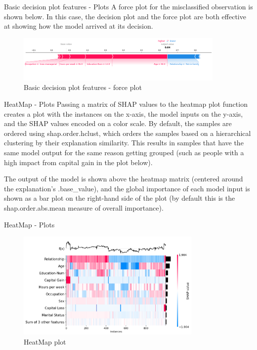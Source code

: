 \documentclass[aspectratio=169]{beamer}
\begin{document}
\begin{frame}{Basic decision plot features - Plots}
A force plot for the misclassified observation is shown below. In this case, the decision plot and the force plot are both effective at showing how the model arrived at its decision.
    \begin{figure}[htbp]
        \centering
        \includegraphics[width=0.9\textwidth]{figs/shap/plots/decision/example_notebooks_api_examples_plots_decision_plot_16_0.png}
        \caption{Basic decision plot features - force plot}
        \label{fig:force-inspection-misclassified-decision}
    \end{figure}
\end{frame}

\begin{frame}{HeatMap - Plots}
Passing a matrix of \ac{SHAP} values to the heatmap plot function creates a plot with the instances on the x-axis, the model inputs on the y-axis, and the \ac{SHAP} values encoded on a color scale. By default, the samples are ordered using shap.order.hclust, which orders the samples based on a hierarchical clustering by their explanation similarity. This results in samples that have the same model output for the same reason getting grouped (such as people with a high impact from capital gain in the plot below).

The output of the model is shown above the heatmap matrix (centered around the explanation’s .base\_value), and the global importance of each model input is shown as a bar plot on the right-hand side of the plot (by default this is the shap.order.abs.mean measure of overall importance).
\end{frame}

\begin{frame}{HeatMap - Plots}
    \begin{figure}[htbp]
        \centering
        \includegraphics[width=0.8\textwidth]{figs/shap/plots/heatmap/example_notebooks_api_examples_plots_heatmap_3_0.png}
        \caption{HeatMap plot}
        \label{fig:heatmap}
    \end{figure}
\end{frame}
\end{document}
